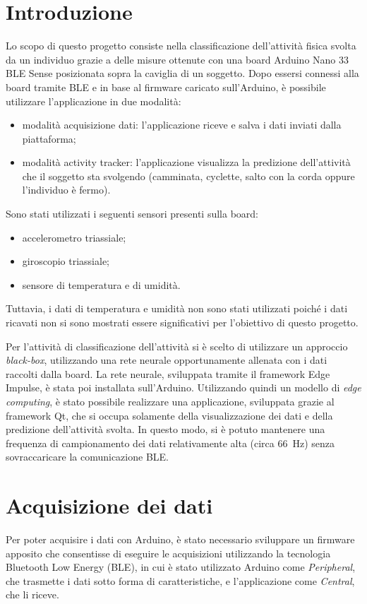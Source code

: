 \section{Introduzione}
Lo scopo di questo progetto consiste nella classificazione dell'attività fisica svolta da un individuo grazie a delle misure ottenute con una board Arduino Nano 33 BLE Sense posizionata sopra la caviglia di un soggetto. Dopo essersi connessi alla board tramite BLE e in base al firmware caricato sull'Arduino, è possibile utilizzare l'applicazione in due modalità:
\begin{itemize}
	\item modalità acquisizione dati: l'applicazione riceve e salva i dati inviati dalla piattaforma;
	\item modalità activity tracker: l'applicazione visualizza la predizione dell'attività che il soggetto sta svolgendo (camminata, cyclette, salto con la corda oppure l'individuo è fermo).
\end{itemize}
Sono stati utilizzati i seguenti sensori presenti sulla board:
\begin{itemize}
	\item accelerometro triassiale;
	\item giroscopio triassiale;
	\item sensore di temperatura e di umidità.
\end{itemize}
Tuttavia, i dati di temperatura e umidità non sono stati utilizzati poiché i dati ricavati non si sono mostrati essere significativi per l'obiettivo di questo progetto.

Per l'attività di classificazione dell'attività si è scelto di utilizzare un approccio \textit{black-box}, utilizzando una rete neurale opportunamente allenata con i dati raccolti dalla board. La rete neurale, sviluppata tramite il framework Edge Impulse, è stata poi installata sull'Arduino. Utilizzando quindi un modello di \textit{edge computing}, è stato possibile realizzare una applicazione, sviluppata grazie al framework Qt, che si occupa solamente della visualizzazione dei dati e della predizione dell'attività svolta. In questo modo, si è potuto mantenere una frequenza di campionamento dei dati relativamente alta (circa \SI{66}{\hertz}) senza sovraccaricare la comunicazione BLE.

\section{Acquisizione dei dati}
Per poter acquisire i dati con Arduino, è stato necessario sviluppare un firmware apposito che consentisse di eseguire le acquisizioni utilizzando la tecnologia Bluetooth Low Energy (BLE), in cui è stato utilizzato Arduino come \textit{Peripheral}, che trasmette i dati sotto forma di caratteristiche, e l'applicazione come \textit{Central}, che li riceve.

